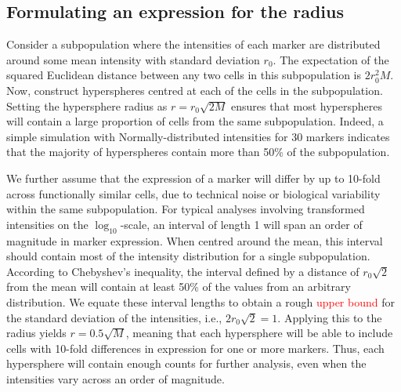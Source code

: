 \documentclass{article}
\newcommand\revised[1]{\textcolor{red}{#1}}
\begin{document}
\subsection{Formulating an expression for the radius}
Consider a subpopulation where the intensities of each marker are distributed around some mean intensity with standard deviation $r_0$.
The expectation of the squared Euclidean distance between any two cells in this subpopulation is $2r_0^2M$.
Now, construct hyperspheres centred at each of the cells in the subpopulation.
Setting the hypersphere radius as $r=r_0\sqrt{2M}$ ensures that most hyperspheres will contain a large proportion of cells from the same subpopulation.
Indeed, a simple simulation with Normally-distributed intensities for 30 markers indicates that the majority of hyperspheres contain more than 50\% of the subpopulation.


We further assume that the expression of a marker will differ by up to 10-fold across functionally similar cells, due to technical noise or biological variability within the same subpopulation.
For typical analyses involving transformed intensities on the $\log_{10}$-scale, an interval of length 1 will span an order of magnitude in marker expression.
When centred around the mean, this interval should contain most of the intensity distribution for a single subpopulation.
According to Chebyshev's inequality, the interval defined by a distance of $r_0\sqrt{2}$ from the mean will contain at least 50\% of the values from an arbitrary distribution.
We equate these interval lengths to obtain a rough \revised{upper bound} for the standard deviation of the intensities, i.e., $2r_0\sqrt{2} = 1$.
Applying this to the radius yields $r=0.5\sqrt{M}$, meaning that each hypersphere will be able to include cells with 10-fold differences in expression for one or more markers.
Thus, each hypersphere will contain enough counts for further analysis, even when the intensities vary across an order of magnitude.
\end{document}
